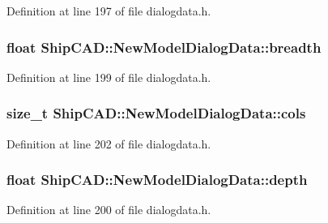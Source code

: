 Definition at line 197 of file dialogdata.\+h.

\subsubsection[{\texorpdfstring{breadth}{breadth}}]{\setlength{\rightskip}{0pt plus 5cm}float Ship\+C\+A\+D\+::\+New\+Model\+Dialog\+Data\+::breadth}\hypertarget{structShipCAD_1_1NewModelDialogData_af2d41edf92aa7fa317cc956801aeab50}{}\label{structShipCAD_1_1NewModelDialogData_af2d41edf92aa7fa317cc956801aeab50}


Definition at line 199 of file dialogdata.\+h.

\subsubsection[{\texorpdfstring{cols}{cols}}]{\setlength{\rightskip}{0pt plus 5cm}size\+\_\+t Ship\+C\+A\+D\+::\+New\+Model\+Dialog\+Data\+::cols}\hypertarget{structShipCAD_1_1NewModelDialogData_ad0fc3e908a10e878c747fac2fe71b67b}{}\label{structShipCAD_1_1NewModelDialogData_ad0fc3e908a10e878c747fac2fe71b67b}


Definition at line 202 of file dialogdata.\+h.

\subsubsection[{\texorpdfstring{depth}{depth}}]{\setlength{\rightskip}{0pt plus 5cm}float Ship\+C\+A\+D\+::\+New\+Model\+Dialog\+Data\+::depth}\hypertarget{structShipCAD_1_1NewModelDialogData_a6941e9fd4fd42257c0b05c6076aadc2a}{}\label{structShipCAD_1_1NewModelDialogData_a6941e9fd4fd42257c0b05c6076aadc2a}


Definition at line 200 of file dialogdata.\+h.

